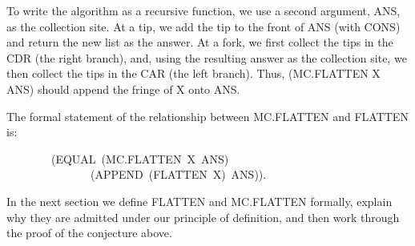 \documentclass[11pt]{book}
\newenvironment{pubasis}{\begin{flushleft}\ttfamily\small}{\normalsize\rmfamily\end{flushleft}}
\begin{document}
To write the algorithm as a recursive function, we
use a second argument, ANS, as the collection site.  At a tip, we add the tip to the front of
ANS (with CONS) and return the new list as the answer.  At a fork, we first
collect the tips in the CDR (the right branch), and, using the resulting answer
as the collection site,
we then collect the tips in the CAR (the left
branch).  Thus, (MC.FLAT\-TEN X ANS) should
append the fringe of X onto ANS.

The formal statement of the relationship between MC.FLAT\-TEN and FLAT\-TEN
is:
\begin{pubasis}
~~~~~~~~(EQUAL~(MC.FLAT\-TEN~X~ANS)\\
~~~~~~~~~~~~~~~(APPEND~(FLATTEN~X)~ANS)).\\
\end{pubasis}
In the next section we define FLAT\-TEN and MC.FLAT\-TEN
formally, explain why they are admitted under our principle of definition,
and then work through the proof of the conjecture above.
\end{document}
